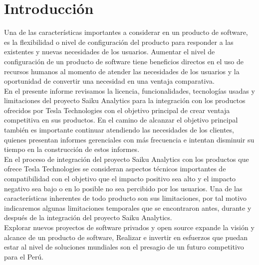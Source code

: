 \clearpage
{}
{}

\chapter*{Introducción}
\begin{spacing}{1.5}
	Una de las características importantes a considerar en un producto de software, es la flexibilidad o nivel de configuración del producto para responder a las existentes y nuevas necesidades de los usuarios. Aumentar el nivel de configuración de un producto de software tiene beneficios directos en el uso de recursos humanos al momento de atender las necesidades de los usuarios y la oportunidad de convertir una necesidad en una ventaja comparativa.\\
	En el presente informe revisamos la licencia, funcionalidades, tecnologías usadas y limitaciones del proyecto Saiku Analytics para la integración con los productos ofrecidos por Tesla Technologies con el objetivo principal de crear ventaja competitiva en sus productos.
	En el camino de alcanzar el objetivo principal también es importante continuar atendiendo las necesidades de los clientes, quienes presentan informes gerenciales con más frecuencia e intentan disminuir su tiempo en la construcción de estos informes.\\
	En el proceso de integración del proyecto Saiku Analytics con los productos que ofrece Tesla Technologies se consideran aspectos técnicos importantes de compatibilidad con el objetivo que el impacto positivo sea alto y el impacto negativo sea bajo o en lo posible no sea percibido por los usuarios. 
	Una de las características inherentes de todo producto son sus limitaciones, por tal motivo indicaremos algunas limitaciones temporales que se encontraron antes, durante y después de la integración del proyecto Saiku Analytics.\\
	Explorar nuevos proyectos de software privados y open source expande la visión y alcance de un producto de software, Realizar e invertir en esfuerzos que puedan estar al nivel de soluciones mundiales son el presagio de un futuro competitivo para el Perú.\\
\end{spacing}
